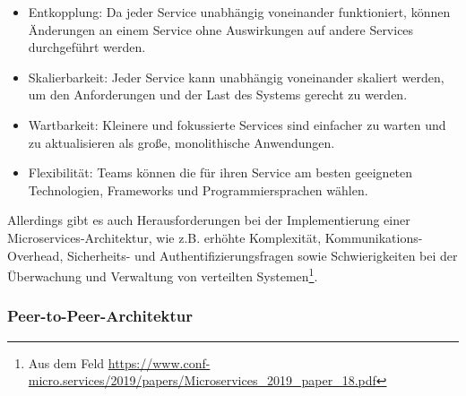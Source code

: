 \documentclass[../vs-script-first-v01.tex]{subfiles}
\begin{document}
\begin{itemize}
\item Entkopplung: Da jeder Service unabhängig voneinander funktioniert, können Änderungen an einem Service ohne Auswirkungen auf andere Services durchgeführt werden.
\item Skalierbarkeit: Jeder Service kann unabhängig voneinander skaliert werden, um den Anforderungen und der Last des Systems gerecht zu werden.
\item Wartbarkeit: Kleinere und fokussierte Services sind einfacher zu warten und zu aktualisieren als große, monolithische Anwendungen.
\item Flexibilität: Teams können die für ihren Service am besten geeigneten Technologien, Frameworks und Programmiersprachen wählen.
\end{itemize}
Allerdings gibt es auch Herausforderungen bei der Implementierung einer Microservices-Architektur, wie z.B. erhöhte Komplexität, Kommunikations-Overhead, Sicherheits- und Authentifizierungsfragen sowie Schwierigkeiten bei der Überwachung und Verwaltung von verteilten Systemen\footnote{Aus dem Feld \url{https://www.conf-micro.services/2019/papers/Microservices_2019_paper_18.pdf}}.

\subsubsection{Peer-to-Peer-Architektur}
\end{document}
